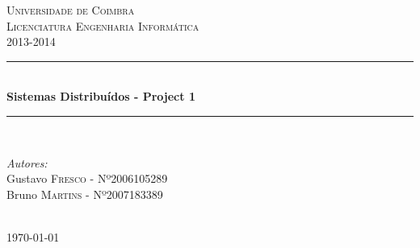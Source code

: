 \documentclass[12pt]{article} %
\begin{document}

\begin{titlepage}

\newcommand{\HRule}{\rule{\linewidth}{0.5mm}} %

\center %

\textsc{\LARGE Universidade de Coimbra}\\[1.5cm] %
\textsc{\Large Licenciatura Engenharia Informática\\2013-2014}\\[0.5cm] %

\HRule \\[0.4cm]
{\huge \bfseries Sistemas Distribuídos - Project 1}\\[0.4cm] %
\HRule \\[1.5cm]

\begin{minipage}{0.8\textwidth}

\begin{flushleft} \large
\emph{Autores:}\\
Gustavo \textsc{Fresco} - Nº2006105289\\ %
Bruno \textsc{Martins} - Nº2007183389
\end{flushleft}

\end{minipage}

\begin{minipage}{0.4\textwidth}
\begin{flushright} \large
\end{flushright}
\end{minipage}\\[4cm]

{\large \today}\\[3cm] %
\vfill %

\end{titlepage}

\tableofcontents %
\end{document}
